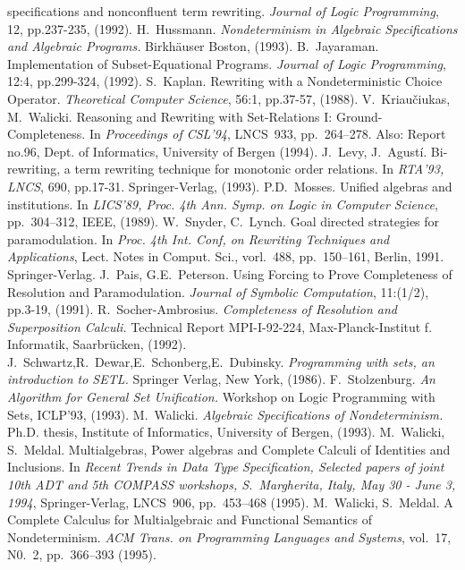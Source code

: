 \begin{thebibliography}{MM99}
   specifications and nonconfluent term rewriting. {\em Journal of Logic
   Programming}, 12, pp.237-235, (1992).
 H.~Hussmann. 
   {\em Nondeterminism in Algebraic Specifications and Algebraic Programs.}
   Birkh\"auser Boston, (1993).
 B.~Jayaraman. Implementation of Subset-Equational 
   Programs. {\em Journal of Logic Programming}, 12:4, pp.299-324, (1992).
 S.~Kaplan. Rewriting with a Nondeterministic Choice
   Operator. {\it Theoretical Computer Science}, 56:1, pp.37-57, (1988).
 V.~Kriau\v ciukas, M.~Walicki.  Reasoning and Rewriting
   with Set-Relations I: Ground-Completeness.  In {\it Proceedings of
   CSL'94}, LNCS~933, pp.~264--278. Also: Report no.96, Dept. of Informatics,
   University of Bergen (1994).
 J.~Levy, J.~Agust\'i. Bi-rewriting, a term rewriting
   technique for monotonic order relations. In {\em RTA'93, LNCS}, 
   690, pp.17-31. Springer-Verlag, (1993).
 P.D.~Mosses. Unified algebras and institutions. In
   {\it LICS'89, Proc. 4th Ann. Symp. on Logic in Computer Science},
   pp.~304--312, IEEE, (1989).
 W.~Snyder, C.~Lynch. Goal directed strategies for
   paramodulation. In {\it Proc. 4th Int. Conf, on Rewriting Techniques and
   Applications}, Lect. Notes in Comput. Sci., vorl.~488, pp.~150--161,
   Berlin, 1991. Springer-Verlag.
 J.~Pais, G.E.~Peterson. Using Forcing to Prove Completeness
   of Resolution and Paramodulation. {\em Journal of Symbolic Computation}, 
   11:(1/2), pp.3-19, (1991).
 R.~Socher-Ambrosius. 
   {\em Completeness of Resolution and Superposition Calculi.}
   Technical Report
   MPI-I-92-224, Max-Planck-Institut f. Informatik, Saarbr\"ucken, (1992).
 J.~Schwartz,R.~Dewar,E.~Schonberg,E.~Dubinsky. 
   {\em Programming with sets, an introduction to SETL. }
   Springer Verlag, New York, (1986).
 F.~Stolzenburg. 
   {\em An Algorithm for General Set Unification.}
   Workshop on Logic Programming with Sets, ICLP'93, (1993).
 M.~Walicki. 
   {\em Algebraic Specifications of Nondeterminism.}
   Ph.D. thesis, Institute of Informatics, University of Bergen, (1993).
 M.~Walicki, S.~Meldal. Multialgebras, Power algebras
   and Complete Calculi of Identities and Inclusions. In {\it Recent Trends
   in Data Type Specification, Selected papers of joint 10th ADT and 5th
   COMPASS workshops, S.~Margherita, Italy, May 30 - June 3, 1994},
   Springer-Verlag, LNCS~906, pp.~453--468 (1995).
 M.~Walicki, S.~Meldal. A Complete Calculus for 
   Multialgebraic and Functional Semantics of Nondeterminism. 
   {\it ACM Trans. on Programming Languages and Systems}, vol.~17, N0.~2,
   pp.~366--393 (1995).
\end{thebibliography} 

